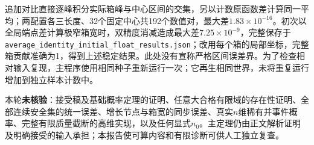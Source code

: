 \documentclass[UTF8,a4paper,11pt,fontset=none]{ctexart}
\begin{document}
追加对比直接逐峰积分实际箱峰与中心区间的交集，另以计数原函数差计算同一平均；两配置各三长度、32个固定中心共192个数值对，最大差\(1.83\times10^{-16}\)。初次以全局端点差计算极窄箱宽时，双精度消减造成最大差\(7.25\times10^{-9}\)，完整保存于\nolinkurl{average_identity_initial_float_results.json}；改用每个箱的局部坐标，完整箱贡献准确为1，得到上述稳定结果。此处没有宣称严格区间误差界。为了检查相对输入复现，主程序使用相同种子重新运行一次；它再生相同世界，未将重复运行增加到独立样本计数中。

本轮\textbf{未核验}：接受稿及基础概率定理的证明、任意大合格有限域的存在性证明、全部连续安全集的统一误差、增长节点与箱宽的同步误差、真实\(n\)维稀有并事件概率、完整有限质量截断的高维实现，以及任何显式\(n_0\)。主定理仍由正文解析证明及明确接受的输入承担；本报告使可算内容和有限诊断可供人工独立复查。
\end{document}

